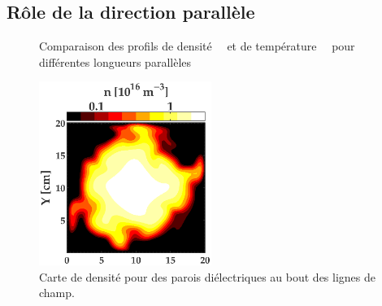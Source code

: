 \begin{refsection}
\subsection{Rôle de la direction parallèle}
\begin{figure}[htbp]
  \centering
    \caption{Comparaison des profils de
    densité~~ et de
    température~~ pour différentes
    longueurs parallèles}
    \label{pandas}
\end{figure}

\begin{figure}[htbp]
\centering
\includegraphics[width=0.5\textwidth]{figures/4-CybeleCarteDensiteIsolant.eps}
{\caption{Carte de densité pour des parois diélectriques au bout des lignes de
champ.}
\label{4-CybeleCarteDensiteIsolant}}
\end{figure}		


\end{refsection}
